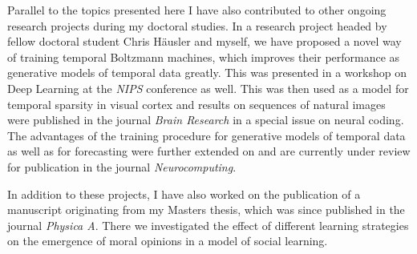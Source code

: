 Parallel to the topics presented here I have also contributed to other ongoing research projects during my doctoral studies. In a research project headed by 
fellow doctoral student Chris H\"ausler and myself, we have proposed a novel way of training temporal Boltzmann machines, which improves their performance as
generative models of temporal data greatly. This was presented in a workshop on Deep Learning at the \emph{NIPS} conference as well. This was
then used as a model for temporal sparsity in visual cortex and results on sequences of natural images were published in the journal \emph{Brain Research} in a
special issue on neural coding. The advantages of the training procedure for generative models of temporal data as well as for forecasting were
further extended on and are currently under review for publication in the journal \emph{Neurocomputing}.\par

In addition to these projects, I have also worked on the publication of a manuscript originating from my Masters thesis, which was since published in the journal 
\emph{Physica A}. There we investigated the effect of different learning strategies on the emergence of moral opinions in a model of social learning.

